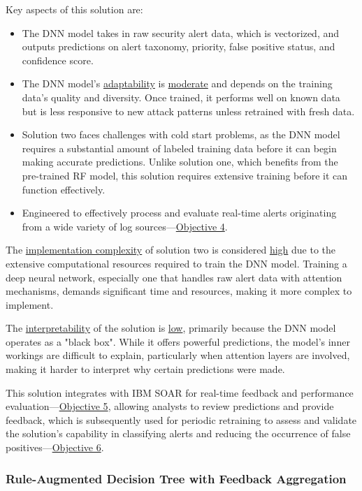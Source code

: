 Key aspects of this solution are:
\begin{itemize}
    \item The DNN model takes in raw security alert data, which is vectorized, and outputs predictions on alert taxonomy, priority, false positive status, and confidence score.
    \item The DNN model's \underline{adaptability} is \underline{moderate} and depends on the training data's quality and diversity. Once trained, it performs well on known data but is less responsive to new attack patterns unless retrained with fresh data.
    \item Solution two faces challenges with cold start problems, as the DNN model requires a substantial amount of labeled training data before it can begin making accurate predictions. Unlike solution one, which benefits from the pre-trained RF model, this solution requires extensive training before it can function effectively.
    \item Engineered to effectively process and evaluate real-time alerts originating from a wide variety of log sources—\hyperref[objective4]{Objective 4}.
\end{itemize}

The \underline{implementation complexity} of solution two is considered \underline{high} due to the extensive computational resources required to train the DNN model. 
Training a deep neural network, especially one that handles raw alert data with attention mechanisms, demands significant time and resources, making it more complex to implement.

The \underline{interpretability} of the solution is \underline{low}, primarily because the DNN model operates as a "black box". 
While it offers powerful predictions, the model's inner workings are difficult to explain, particularly when attention layers are involved, making it harder to interpret why certain predictions were made.

This solution integrates with IBM SOAR for real-time feedback and performance evaluation—\hyperref[objective5]{Objective 5}, allowing analysts to review predictions and provide feedback, which is subsequently used for periodic retraining to assess and validate the solution's capability in classifying alerts and reducing the occurrence of false positives—\hyperref[objective6]{Objective 6}.

\subsubsection{Rule-Augmented Decision Tree with Feedback Aggregation}

